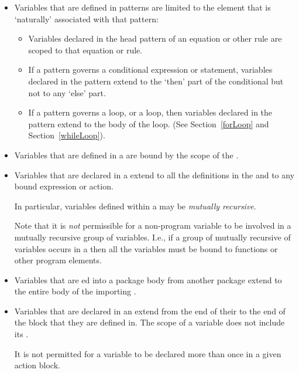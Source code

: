 \begin{itemize}
\item Variables that are defined in patterns are limited to the element that is `naturally' associated with that pattern:
\begin{itemize}
\item Variables declared in the head pattern of an equation or other rule are scoped to that equation or rule.
\item If a pattern governs a conditional expression or statement, variables declared in the pattern extend to the `then' part of the conditional but not to any `else' part.
\item If a pattern governs a  loop, or a  loop, then variables declared in the pattern extend to the body of the loop. (See Section~\vref{forLoop} and Section~\vref{whileLoop}).
\end{itemize}
\item Variables that are defined in a  are bound by the scope of the .
\item Variables that are declared in a  extend to all the  definitions in the  and to any bound expression or action.
\begin{aside}
In particular, variables defined within a  may be \emph{mutually recursive}.
\begin{aside}
Note that it is \emph{not} permissible for a non-program variable to be involved in a mutually recursive group of variables. I.e., if a group of mutually recursive of variables occurs in a  then all the variables must be bound to functions or other program elements.
\end{aside}
\end{aside}
\item Variables that are ed into a package body from another package extend to the entire body of the importing .
\item Variables that are declared in an  extend from the end of their  to the end of the block that they are defined in. The scope of a variable does not include its .

It is not permitted for a variable to be declared more than once in a given action block.
\end{itemize}

